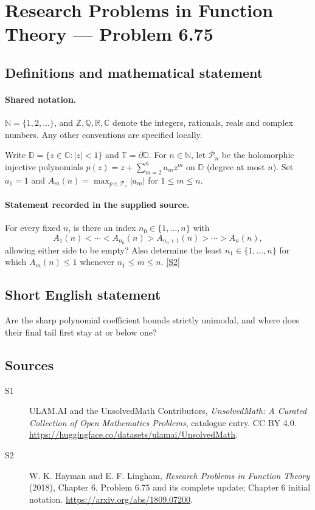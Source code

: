 \documentclass[11pt]{article}
\newcommand{\sref}[2]{\hyperlink{source:#1:#2}{[S#2]}}
\begin{document}
\section{Research Problems in Function Theory — Problem 6.75}\label{statement}

\subsection{Definitions and mathematical statement}

\paragraph{Shared notation.}$\mathbb N=\{1,2,\ldots\}$, and $\mathbb Z,\mathbb Q,\mathbb R,\mathbb C$ denote the integers, rationals, reals and complex numbers. Any other conventions are specified locally.


Write $\mathbb D=\{z\in\mathbb C:|z|<1\}$ and $\mathbb T=\partial\mathbb D$. For $n\in\mathbb N$, let $\mathcal P_n$ be the holomorphic injective polynomials $p(z)=z+\sum_{m=2}^n a_mz^m$ on $\mathbb D$ (degree at most $n$). Set $a_1=1$ and $A_m(n)=\max_{p\in\mathcal P_n}|a_m|$ for $1\le m\le n$.
\paragraph{Statement recorded in the supplied source.}
For every fixed $n$, is there an index $n_0\in\{1,\ldots,n\}$ with \[A_1(n)<\cdots<A_{n_0}(n)>A_{n_0+1}(n)>\cdots>A_n(n),\] allowing either side to be empty? Also determine the least $n_1\in\{1,\ldots,n\}$ for which $A_m(n)\le1$ whenever $n_1\le m\le n$. \sref{statement}{2}
\subsection{Short English statement}
Are the sharp polynomial coefficient bounds strictly unimodal, and where does their final tail first stay at or below one?
\subsection{Sources}
\begin{description}
\item[\hypertarget{source:statement:1}{S1}] ULAM.AI and the UnsolvedMath Contributors, \emph{UnsolvedMath: A Curated Collection of Open Mathematics Problems}, catalogue entry. CC BY 4.0. \url{https://huggingface.co/datasets/ulamai/UnsolvedMath}.
\item[\hypertarget{source:statement:2}{S2}] W. K. Hayman and E. F. Lingham, \emph{Research Problems in Function Theory} (2018), Chapter 6, Problem 6.75 and its complete update; Chapter 6 initial notation. \url{https://arxiv.org/abs/1809.07200}.
\end{description}
\label{end:statement}
\end{document}
